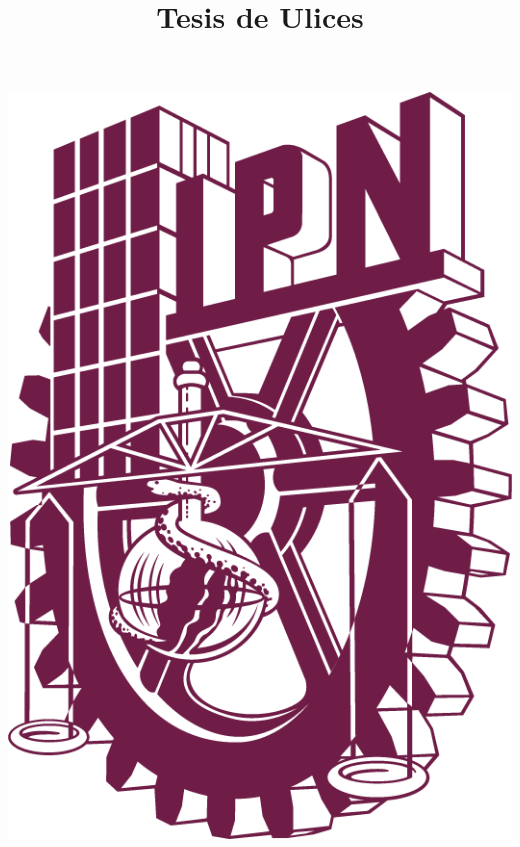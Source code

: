 	
\title{Tesis de Ulices}

\begin{center}
\newcommand{\HRule}{\rule{\linewidth}{0.5mm}}

\begin{minipage}{0.48\textwidth} \begin{flushleft}
\includegraphics[scale = 0.125]{images/LOGO POLI PANTONE 222 C.png}
\end{flushleft}\end{minipage}
\begin{minipage}{0.48\textwidth} \begin{flushright}

\end{flushright}
\end{minipage}
\end{center}
